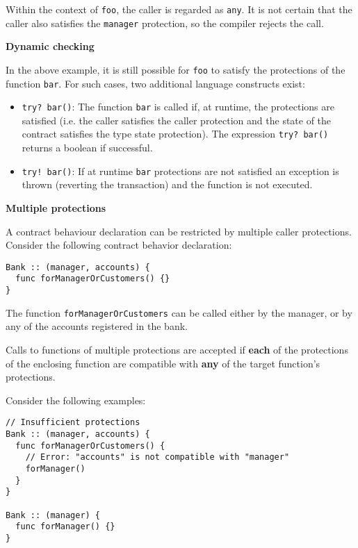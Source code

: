 Within the context of \texttt{foo}, the caller is regarded as \texttt{any}. It is not certain that the caller also satisfies the \texttt{manager} protection, so the compiler rejects the call.

\textbf{Dynamic checking}
\label{sec:appendix-b-dynamic-checking}

In the above example, it is still possible for \texttt{foo} to satisfy the protections of the function \texttt{bar}. For such cases, two additional language constructs exist:

\begin{itemize}
	\item \texttt{try? bar()}: The function \texttt{bar} is called if, at runtime, the protections are satisfied (i.e. the caller satisfies the caller protection and the state of the contract satisfies the type state protection). The expression \texttt{try? bar()} returns a boolean if successful.
	\item \texttt{try! bar()}: If at runtime \texttt{bar} protections are not satisfied an exception is thrown (reverting the transaction) and the function is not executed.
\end{itemize}

\textbf{Multiple protections}
\label{sec:appendix-b-multiple-protections}

A contract behaviour declaration can be restricted by multiple caller protections. Consider the following contract behavior declaration:

\begin{verbatim}
Bank :: (manager, accounts) {
  func forManagerOrCustomers() {}
}
\end{verbatim}

The function \texttt{forManagerOrCustomers} can be called either by the manager, or by any of the accounts registered in the bank.

Calls to functions of multiple protections are accepted if \textbf{each} of the protections of the enclosing function are compatible with \textbf{any} of the target function's protections.

Consider the following examples:

\begin{verbatim}
// Insufficient protections
Bank :: (manager, accounts) {
  func forManagerOrCustomers() {
    // Error: "accounts" is not compatible with "manager"
    forManager()
  }
}

Bank :: (manager) {
  func forManager() {}
}
\end{verbatim}

